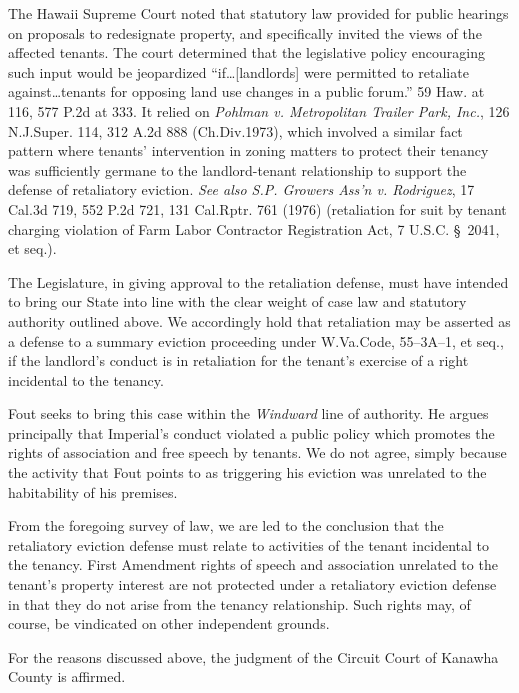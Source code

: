 The Hawaii Supreme Court noted that statutory law provided for public hearings
on proposals to redesignate property, and specifically invited the views of the
affected tenants. The court determined that the legislative policy encouraging
such input would be jeopardized ``if\ldots [landlords] were permitted to
retaliate against\ldots tenants for opposing land use changes in a public
forum.'' 59 Haw. at 116, 577 P.2d at 333. It relied on \textit{Pohlman v.
Metropolitan Trailer Park, Inc.}, 126 N.J.Super. 114, 312 A.2d 888
(Ch.Div.1973), which involved a similar fact pattern where tenants'
intervention in zoning matters to protect their tenancy was sufficiently
germane to the landlord-tenant relationship to support the defense of
retaliatory eviction. \textit{See also S.P. Growers Ass'n v. Rodriguez}, 17
Cal.3d 719, 552 P.2d 721, 131 Cal.Rptr. 761 (1976) (retaliation for suit by
tenant charging violation of Farm Labor Contractor Registration Act, 7 U.S.C.
\S~2041, et seq.).

The Legislature, in giving approval to the retaliation defense, must have
intended to bring our State into line with the clear weight of case law and
statutory authority outlined above. We accordingly hold that retaliation may be
asserted as a defense to a summary eviction proceeding under W.Va.Code,
55--3A--1, et seq., if the landlord's conduct is in retaliation for the
tenant's exercise of a right incidental to the tenancy.

Fout seeks to bring this case within the \textit{Windward} line of authority. He
argues principally that Imperial's conduct violated a public policy which
promotes the rights of association and free speech by tenants. We do not agree,
simply because the activity that Fout points to as triggering his eviction was
unrelated to the habitability of his premises.

From the foregoing survey of law, we are led to the conclusion that the
retaliatory eviction defense must relate to activities of the tenant incidental
to the tenancy. First Amendment rights of speech and association unrelated to
the tenant's property interest are not protected under a retaliatory eviction
defense in that they do not arise from the tenancy relationship. Such rights
may, of course, be vindicated on other independent grounds.

For the reasons discussed above, the judgment of the Circuit Court of Kanawha
County is affirmed.

